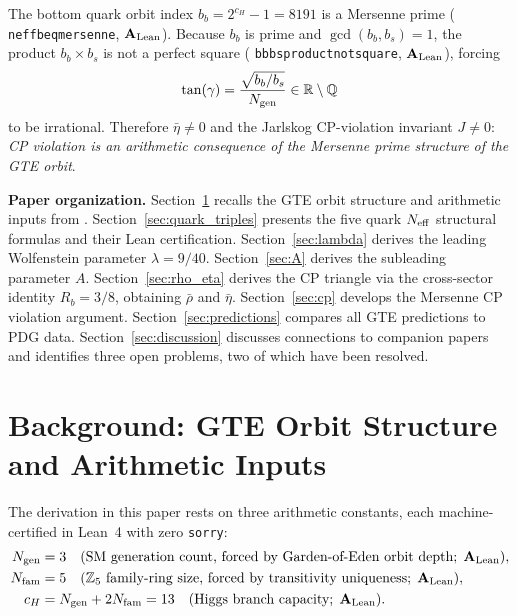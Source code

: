 \documentclass[11pt]{article}
\theoremstyle{remark}
\newcommand{\Ngen}{N_{\rm gen}}
\newcommand{\Nfam}{N_{\rm fam}}
\newcommand{\cH}{c_H}
\newcommand{\lean}[1]{%
  \penalty-100
  \begingroup\def\_{\textunderscore\allowbreak}\texttt{#1}\endgroup}
\newcommand{\lam}{\lambda}
\newcommand{\Rbar}{\bar{\rho}}
\newcommand{\Ebar}{\bar{\eta}}
\newcommand{\bs}{b_s}
\newcommand{\bb}{b_b}
\newcommand{\Rb}{R_b}
\newcommand{\CatAL}{\ensuremath{\textbf{A}_{\rm Lean}}}
\begin{document}
\begin{tcolorbox}[colback=green!4,colframe=green!45!black,
  title={\textbf{Main result (CKM-3): Irrational CP phase from Mersenne arithmetic}},
  fonttitle=\bfseries,left=6pt,right=6pt,top=4pt,bottom=4pt]
\small
The bottom quark orbit index $\bb = 2^{\cH}-1 = 8191$ is a Mersenne prime
(\lean{neff\_b\_eq\_mersenne}, $\CatAL$).
Because $\bb$ is prime and $\gcd(\bb, \bs) = 1$, the product $\bb\!\times\!\bs$ is
not a perfect square (\lean{bb\_bs\_product\_not\_square}, $\CatAL$), forcing
\[
  \tan(\gamma) = \frac{\sqrt{\bb/\bs}}{\Ngen} \in \mathbb{R}\setminus\mathbb{Q}
\]
to be irrational.  Therefore $\Ebar\neq 0$ and the Jarlskog CP-violation invariant
$J\neq 0$: \emph{CP violation is an arithmetic consequence of the Mersenne prime
structure of the GTE orbit}.
\end{tcolorbox}

\medskip

\textbf{Paper organization.}
Section~\ref{sec:background} recalls the GTE orbit structure and arithmetic inputs from
\cite{SpivackCompUniversality,SpivackWeinberg}.
Section~\ref{sec:quark_triples} presents the five quark $N_{\rm eff}$ structural formulas
and their Lean certification.
Section~\ref{sec:lambda} derives the leading Wolfenstein parameter $\lam = 9/40$.
Section~\ref{sec:A} derives the subleading parameter $A$.
Section~\ref{sec:rho_eta} derives the CP triangle via the cross-sector identity $\Rb = 3/8$,
obtaining $\Rbar$ and $\Ebar$.
Section~\ref{sec:cp} develops the Mersenne CP violation argument.
Section~\ref{sec:predictions} compares all GTE predictions to PDG data.
Section~\ref{sec:discussion} discusses connections to companion papers and identifies three open problems, two of which have been resolved.

\section{Background: GTE Orbit Structure and Arithmetic Inputs}
\label{sec:background}

The derivation in this paper rests on three arithmetic constants, each machine-certified
in Lean~4 with zero \texttt{sorry}:
\begin{align}
  \Ngen &= 3 \quad (\text{SM generation count, forced by Garden-of-Eden orbit depth};\;\CatAL),
  \nonumber\\
  \Nfam &= 5 \quad (\mathbb{Z}_5 \text{ family-ring size, forced by transitivity uniqueness};\;\CatAL),
  \nonumber\\
  \cH   &= \Ngen + 2\Nfam = 13 \quad (\text{Higgs branch capacity};\;\CatAL). \nonumber
\end{align}
\end{document}
